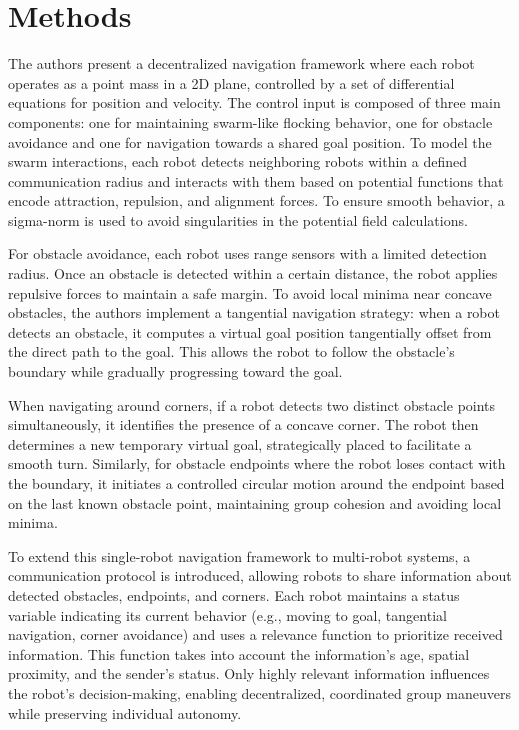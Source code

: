 \documentclass[conference]{IEEEtran}
\begin{document}
\section{Methods}
\cite{Olcay.2020} The authors present a decentralized navigation framework where each robot operates as a point mass in a 2D plane, 
controlled by a set of differential equations for position and velocity. The control input is composed of three main components: one 
for maintaining swarm-like flocking behavior, one for obstacle avoidance and one for navigation towards a shared goal position. To 
model the swarm interactions, each robot detects neighboring robots within a defined communication radius and interacts with them based 
on potential functions that encode attraction, repulsion, and alignment forces. To ensure smooth behavior, a sigma-norm is used to avoid 
singularities in the potential field calculations.

For obstacle avoidance, each robot uses range sensors with a limited detection radius. Once an obstacle is detected within a certain 
distance, the robot applies repulsive forces to maintain a safe margin. To avoid local minima near concave obstacles, the authors 
implement a tangential navigation strategy: when a robot detects an obstacle, it computes a virtual goal position tangentially offset 
from the direct path to the goal. This allows the robot to follow the obstacle's boundary while gradually progressing toward the goal.

When navigating around corners, if a robot detects two distinct obstacle points simultaneously, it identifies the presence of a concave 
corner. The robot then determines a new temporary virtual goal, strategically placed to facilitate a smooth turn. Similarly, for obstacle 
endpoints where the robot loses contact with the boundary, it initiates a controlled circular motion around the endpoint based on the 
last known obstacle point, maintaining group cohesion and avoiding local minima.

To extend this single-robot navigation framework to multi-robot systems, a communication protocol is introduced, allowing robots to 
share information about detected obstacles, endpoints, and corners. Each robot maintains a status variable indicating its current 
behavior (e.g., moving to goal, tangential navigation, corner avoidance) and uses a relevance function to prioritize received 
information. This function takes into account the information's age, spatial proximity, and the sender's status. Only highly relevant 
information influences the robot's decision-making, enabling decentralized, coordinated group maneuvers while preserving individual autonomy.
\end{document}
